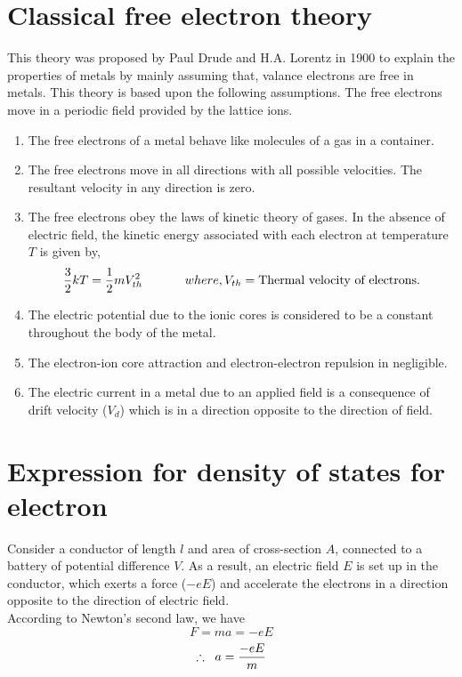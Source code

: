 \documentclass[15pt]{article}
\begin{document}
\section*{Classical free electron theory}
This theory was proposed by Paul Drude and H.A. Lorentz in 1900 to explain the properties of metals by mainly assuming that, valance electrons are free in metals. This theory is based upon the following assumptions. The free electrons move in a periodic field provided by the lattice ions.
\begin{enumerate}
    \item The free electrons of a metal behave like molecules of a gas in a container.
    \item The free electrons move in all directions with all possible velocities. The resultant velocity in any direction is zero.
    \item The free electrons obey the laws of kinetic theory of gases. In the absence of electric field, the kinetic energy associated with each electron at temperature $T$ is given by,
        \begin{equation*}
            \frac{3}{2}kT = \frac{1}{2}m V_{th}^{2}\hspace{1.2cm} where, V_{th} = \text{Thermal velocity of electrons.}
        \end{equation*}
    \item The electric potential due to the ionic cores is considered to be a constant throughout the body of the metal.
    \item The electron-ion core attraction and electron-electron repulsion in negligible.
    \item The electric current in a metal due to an applied field is a consequence of drift velocity ($V_{d}$) which is in a direction opposite to the direction of field. 
\end{enumerate}
    

\section*{Expression for density of states for electron}
Consider a conductor of length $l$ and area of cross-section $A$, connected to a battery of potential difference $V$. As a result, an electric field $E$ is set up in the conductor, which exerts a force ($-eE$) and accelerate the electrons in a direction opposite to the direction of electric field.
\\
According to Newton's second law, we have 
    \begin{equation*}
        F = ma = -eE
    \end{equation*}
    \begin{equation*}
        \therefore \hspace{0.2cm} a = \frac{-eE}{m}
    \end{equation*}
\end{document}
